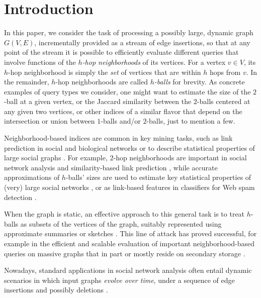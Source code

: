 \section{Introduction}
In this paper, we consider the task of processing a possibly large, dynamic graph $G(V,E)$, incrementally provided as a stream of edge insertions, so that at any point of the stream it is possible to efficiently evaluate different queries that involve functions of the \textit{$h$-hop neighborhoods} of its vertices. For a vertex $v\in V$, its $h$-hop neighborhood is simply the \emph{set} of vertices that are within $h$ hops from $v$. In the remainder, $h$-hop neighborhoods are called \textit{$h$-balls} for brevity. As concrete examples of query types we consider, one might want to estimate the size of the $2$-ball at a given vertex, or the Jaccard similarity between the $2$-balls centered at any given two vertices, or other indices of a similar flavor that depend on the intersection or union between $1$-balls and/or $2$-balls, just to mention a few.

Neighborhood-based indices are common in key mining tasks, such as link prediction in social \cite{liben2003link} and biological networks \cite{wang2023assessment} or to describe statistical properties of large social graphs \cite{becchetti2008efficient}. For example, $2$-hop neighborhoods are important in social network analysis and similarity-based link prediction \cite{zhou2021experimental,zareie2020similarity,Sim-Nodes_Survey_2024}, while accurate approximations of $h$-balls' sizes are used to estimate key statistical properties of (very) large social networks \cite{boldi2011hyperanf,backstrom2012four}, or as link-based features in classifiers for Web spam detection \cite{becchetti2008link}. 
 
When the graph is static, an effective approach to this general task is to treat $h$-balls as subsets of the vertices of the graph, suitably represented using approximate summaries or sketches \cite{agarwal2013mergeable}. This line of attack has proved successful, for example in the efficient and scalable evaluation of important neighborhood-based queries on massive graphs that in part or mostly reside on secondary storage \cite{feigenbaum2005graph,mcgregor2014graph,becchetti2008efficient,boldi2011hyperanf}.
  

Nowadays, standard applications in social network analysis often entail dynamic scenarios in which  input graphs \textit{evolve over time}, under a sequence of  edge insertions and possibly deletions \cite{aggarwal2014evolutionary}. 



